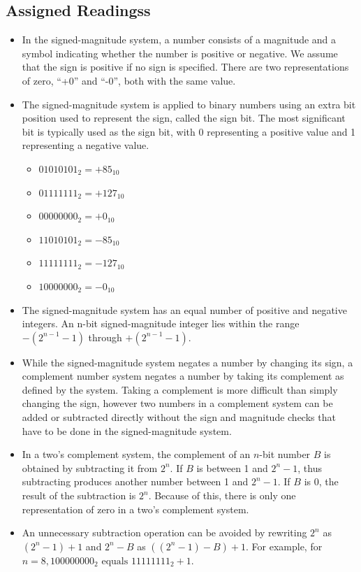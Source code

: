 \documentclass[10pt,a4paper]{article}
\begin{document}
\subsection{Assigned Readingss}
\begin{itemize}
\item In the signed-magnitude system, a number consists of a magnitude and a symbol indicating whether the number is positive or negative. We assume that the sign is positive if no sign is specified. There are two representations of zero, ``+0'' and ``-0'', both with the same value.
\item The signed-magnitude system is applied to binary numbers using an extra bit position used to represent the sign, called the sign bit. The most significant bit is typically used as the sign bit, with 0 representing a positive value and 1 representing a negative value.
\begin{itemize}
\item $01010101_2=+85_{10}$
\item $01111111_2=+127_{10}$
\item $00000000_2=+0_{10}$
\item $11010101_2=-85_{10}$
\item $11111111_2=-127_{10}$
\item $10000000_2=-0_{10}$
\end{itemize}
\item The signed-magnitude system has an equal number of positive and negative integers. An n-bit signed-magnitude integer lies within the range $-(2^{n-1}-1)$ through $+(2^{n-1}-1)$.
\item While the signed-magnitude system negates a number by changing its sign, a complement number system negates a number by taking its complement as defined by the system. Taking a complement is more difficult than simply changing the sign, however two numbers in a complement system can be added or subtracted directly without the sign and magnitude checks that have to be done in the signed-magnitude system.
\item In a two's complement system, the complement of an $n$-bit number $B$ is obtained by subtracting it from $2^n$. If $B$ is between 1 and $2^n-1$, thus subtracting produces another number between 1 and $2^n-1$. If $B$ is 0, the result of the subtraction is $2^n$. Because of this, there is only one representation of zero in a two's complement system. 
\item An unnecessary subtraction operation can be avoided by rewriting $2^n$ as $(2^n-1)+1$ and $2^n-B$ as $((2^n-1)-B)+1$. For example, for $n=8, 100000000_2\text{ equals }11111111_2+1$. 

\end{itemize}
\end{document}
